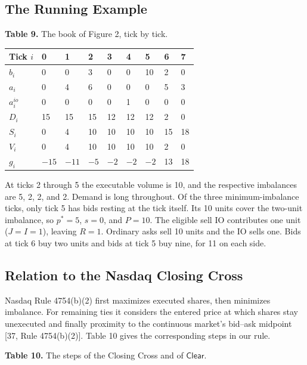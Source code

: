 \subsection{The Running Example}

\textbf{Table 9.} The book of Figure 2, tick by tick.

\begin{longtable}[]{@{}lllllllll@{}}
\toprule\noalign{}
Tick \(i\) & 0 & 1 & 2 & 3 & 4 & 5 & 6 & 7 \\
\midrule\noalign{}
\endhead
\bottomrule\noalign{}
\endlastfoot
\(b_i\) & 0 & 0 & 3 & 0 & 0 & 10 & 2 & 0 \\
\(a_i\) & 0 & 4 & 6 & 0 & 0 & 0 & 5 & 3 \\
\(a^{io}_i\) & 0 & 0 & 0 & 0 & 1 & 0 & 0 & 0 \\
\(D_i\) & 15 & 15 & 15 & 12 & 12 & 12 & 2 & 0 \\
\(S_i\) & 0 & 4 & 10 & 10 & 10 & 10 & 15 & 18 \\
\(V_i\) & 0 & 4 & 10 & 10 & 10 & 10 & 2 & 0 \\
\(g_i\) & \(-15\) & \(-11\) & \(-5\) & \(-2\) & \(-2\) & \(-2\) & 13 & 18 \\
\end{longtable}

At ticks 2 through 5 the executable volume is 10, and the respective imbalances are 5, 2, 2, and 2. Demand is long throughout. Of the three minimum-imbalance ticks, only tick 5 has bids resting at the tick itself. Its 10 units cover the two-unit imbalance, so \(p^*=5\), \(s=0\), and \(P=10\). The eligible sell IO contributes one unit (\(J=I=1\)), leaving \(R=1\). Ordinary asks sell 10 units and the IO sells one. Bids at tick 6 buy two units and bids at tick 5 buy nine, for 11 on each side.

\subsection{Relation to the Nasdaq Closing Cross}

Nasdaq Rule 4754(b)(2) first maximizes executed shares, then minimizes imbalance. For remaining ties it considers the entered price at which shares stay unexecuted and finally proximity to the continuous market's bid--ask midpoint [37, Rule 4754(b)(2)]. Table 10 gives the corresponding steps in our rule.

\textbf{Table 10.} The steps of the Closing Cross and of \(\mathsf{Clear}\).

